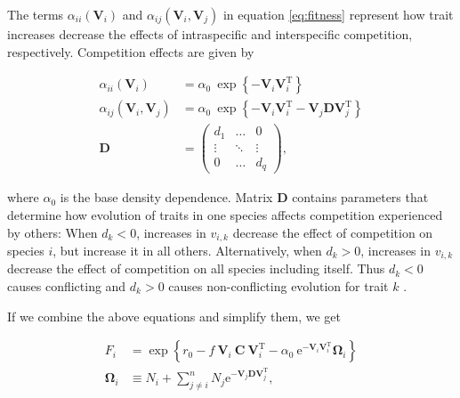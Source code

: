 The terms $\alpha_{ii}(\mathbf{V}_i)$ and $\alpha_{ij}(\mathbf{V}_i, \mathbf{V}_j)$
in equation \ref{eq:fitness} represent how trait increases decrease the effects
of intraspecific and interspecific competition, respectively.
Competition effects are given by

\begin{equation} \label{eq:competition}
\begin{split}
    \alpha_{ii}(\mathbf{V}_i) &= \alpha_0 ~\exp \left\{- \mathbf{V}_i
        \mathbf{V}_i^{\textrm{T}} \right\} \\
    \alpha_{ij}(\mathbf{V}_i, \mathbf{V}_j) &= \alpha_0 ~\exp \left\{
        - \mathbf{V}_i \mathbf{V}_i^{\textrm{T}} -
        \mathbf{V}_j \mathbf{D} \mathbf{V}_j^{\textrm{T}} \right\} \\
    \mathbf{D} &= \begin{pmatrix}
        d_1     & \ldots    & 0 \\
        \vdots  & \ddots    & \vdots \\
        0       & \ldots    & d_q
        \end{pmatrix}
	\textrm{,}
\end{split}
\end{equation}

\noindent where $\alpha_0$ is the base density dependence.
Matrix $\mathbf{D}$ contains parameters that determine how evolution of traits
in one species affects competition experienced by others:
When $d_k < 0$, increases in $v_{i,k}$ decrease the
effect of competition on species $i$, but increase it in all others.
Alternatively, when $d_k > 0$, increases in $v_{i,k}$ decrease the effect of
competition on all species including itself.
Thus $d_k < 0$ causes conflicting and $d_k > 0$ causes non-conflicting evolution
for trait $k$ \citep{Northfield:2013if}.


If we combine the above equations and simplify them, we get

\begin{equation} \label{eq:fitness-full}
\begin{split}
    F_{i} &= \exp \left\{
        r_0 - f ~ \mathbf{V}_i ~ \mathbf{C} ~ \mathbf{V}_{i}^{\textrm{T}} -
        \alpha_0 ~\textrm{e}^{- \mathbf{V}_i \mathbf{V}_i^{\textrm{T}} } \mathbf{\Omega}_{i}
        \right\} \\
        \mathbf{\Omega}_i &\equiv N_i +
            \sum_{j \ne i}^{n}{ N_j \textrm{e}^{ - \mathbf{V}_j \mathbf{D} \mathbf{V}_j^{\textrm{T}} } }
        \textrm{,}
\end{split}
\end{equation}

